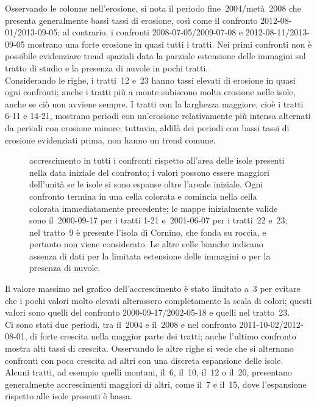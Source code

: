 Osservando le colonne nell'erosione, si nota il periodo fine~2004/metà~2008 che presenta generalmente bassi tassi di erosione, così come il confronto 2012-08-01/2013-09-05;
al contrario, i confronti 2008-07-05/2009-07-08 e 2012-08-11/2013-09-05 mostrano una forte erosione in quasi tutti i tratti.
Nei primi confronti non è possibile evidenziare trend spaziali data la parziale estensione delle immagini sul tratto di studio e la presenza di nuvole in pochi tratti.
\\
Considerando le righe, i tratti~12 e~23 hanno tassi elevati di erosione in quasi ogni confronti; anche i tratti più a monte subiscono molta erosione nelle isole, anche se ciò non avviene sempre.
I tratti con la larghezza maggiore, cioè i tratti 6-11 e 14-21, mostrano periodi con un'erosione relativamente più intensa alternati da periodi con erosione minore; tuttavia, aldilà dei periodi con bassi tassi di erosione evidenziati prima, non hanno un trend comune.
%
\begin{figure}
	\centering
	
	\caption[accrescimento in tutti i confronti rispetto all'area delle isole presenti inizialmente]{accrescimento in tutti i confronti rispetto all'area delle isole presenti nella data iniziale del confronto; i valori possono essere maggiori dell'unità se le isole si sono espanse oltre l'areale iniziale.
	Ogni confronto termina in una cella colorata e comincia nella cella colorata immediatamente precedente; le mappe inizialmente valide sono il~2000-09-17 per i tratti 1-21 e~2001-06-07 per i tratti~22 e~23; nel tratto~9 è presente l'isola di Cornino, che fonda su roccia, e pertanto non viene considerato.
	Le altre celle bianche indicano assenza di dati per la limitata estensione delle immagini o per la presenza di nuvole.}
	\label{graph:accrescimento-matrix}
\end{figure}
%

Il valore massimo nel grafico dell'accrescimento è stato limitato a~\num{3} per evitare che i pochi valori molto elevati alterassero completamente la scala di colori; questi valori sono quelli del confronto 2000-09-17/2002-05-18 e quelli nel tratto~23.
\\
Ci sono stati due periodi, tra il~2004 e il~2008 e nel confronto 2011-10-02/2012-08-01, di forte crescita nella maggior parte dei tratti; anche l'ultimo confronto mostra alti tassi di crescita.
Osservando le altre righe si vede che si alternano confronti con poca crescita ad altri con una discreta espansione delle isole.
\\
Alcuni tratti, ad esempio quelli montani, il~6, il~10, il~12 o il~20, presentano generalmente accrescimenti maggiori di altri, come il~7 e il~15, dove l'espansione rispetto alle isole presenti è bassa.


